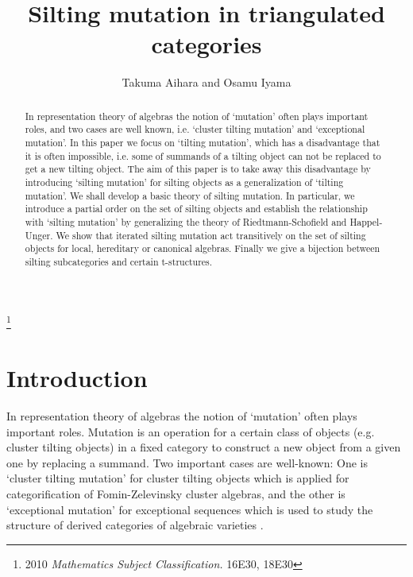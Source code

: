 \documentclass[a4paper,reqno]{amsart}
\theoremstyle{definition}
\begin{document}
\title{Silting mutation in triangulated categories}
\author{Takuma Aihara and Osamu Iyama}
\address{T. Aihara: Division of Mathematical Science and Physics, 
Graduate School of Science and Technology, Chiba University, Yayoi-cho, Chiba 263-8522, Japan}
\address{O. Iyama: Graduate School of Mathematics, Nagoya University, Chikusa-ku, Nagoya,
464-8602 Japan}
\thanks{2010 {\em Mathematics Subject Classification.} 16E30, 18E30}

\begin{abstract}
In representation theory of algebras the notion of `mutation' often plays important roles,
and two cases are well known, i.e. `cluster tilting mutation' and `exceptional mutation'.
In this paper we focus on `tilting mutation', which has a disadvantage that it is often 
impossible, i.e. some of summands of a tilting object can not be replaced to get a new tilting 
object. The aim of this paper is to take away this disadvantage by introducing `silting mutation'
for silting objects as a generalization of `tilting mutation'. We shall develop a basic
theory of silting mutation.
In particular, we introduce a partial order on the set of silting objects and establish the relationship with `silting mutation' by generalizing the theory of
Riedtmann-Schofield and Happel-Unger. We show that iterated silting mutation act transitively on the set of silting objects for local, hereditary or canonical algebras.
Finally we give a bijection between silting subcategories and certain t-structures.
\end{abstract}
\maketitle
\tableofcontents


\section{Introduction}

In representation theory of algebras the notion of `mutation' often plays important roles. 
Mutation is an operation for a certain class of objects (e.g. cluster tilting objects)
in a fixed category to construct a new object from a given one by replacing
a summand.
Two important cases are well-known: One is `cluster tilting mutation' \cite{BMRRT,IY,IW}
for cluster tilting objects which is applied for categorification of
Fomin-Zelevinsky cluster algebras,
and the other is `exceptional mutation' for exceptional sequences 
which is used to study the structure of derived categories of algebraic varieties \cite{GR,C}.
\end{document}
